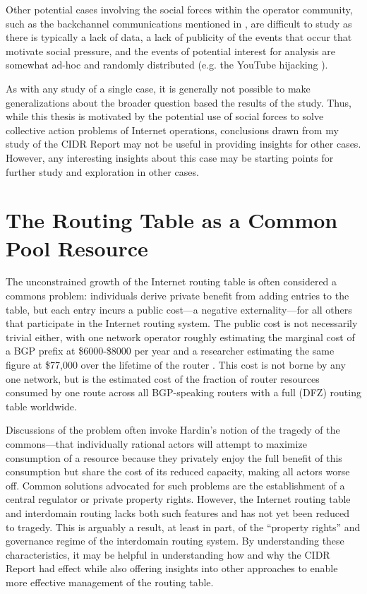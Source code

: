 Other potential cases involving the social forces within the operator community, such as the backchannel communications mentioned in \cite{Mathew:2010ly}, are difficult to study as there is typically a lack of data, a lack of publicity of the events that occur that motivate social pressure, and the events of potential interest for analysis are somewhat ad-hoc and randomly distributed (e.g. the YouTube hijacking \cite{Brown:2008hc}).


As with any study of a single case, it is generally not possible to make generalizations about the broader question based the results of the study. Thus, while this thesis is motivated by the potential use of social forces to solve collective action problems of Internet operations, conclusions drawn from my study of the CIDR Report may not be useful in providing insights for other cases. However, any interesting insights about this case may be starting points for further study and exploration in other cases.

\section{The Routing Table as a Common Pool Resource}

The unconstrained growth of the Internet routing table is often considered a commons problem: individuals derive private benefit from adding entries to the table, but each entry incurs a public cost---a negative externality---for all others that participate in the Internet routing system. The public cost is not necessarily trivial either, with one network operator roughly estimating the marginal cost of a BGP prefix at \$6000-\$8000 per year \cite{Herrin:2008qa} and a researcher estimating the same figure at \$77,000 over the lifetime of the router \cite{Clayton:2010bh}. This cost is not borne by any one network, but is the estimated cost of the fraction of router resources consumed by one route across all BGP-speaking routers with a full (DFZ) routing table worldwide.

Discussions of the problem \cite{Huston:2001bs,Clayton:2010bh,Bellovin:2001qf} often invoke Hardin's \cite{Hardin:1968uq} notion of the tragedy of the commons---that individually rational actors will attempt to maximize consumption of a resource because they privately enjoy the full benefit of this consumption but share the cost of its reduced capacity, making all actors worse off. Common solutions advocated for such problems are the establishment of a central regulator or private property rights. However, the Internet routing table and interdomain routing lacks both such features and has not yet been reduced to tragedy. This is arguably a result, at least in part, of the ``property rights'' and governance regime of the interdomain routing system. By understanding these characteristics, it may be helpful in understanding how and why the CIDR Report had effect while also offering insights into other approaches to enable more effective management of the routing table.

